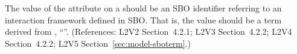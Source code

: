 The value of the  attribute on a \Model should be
an SBO identifier referring to an interaction framework defined
in SBO.  That is, the value should be a term derived from
\sbointeractionID, ``''.  (References: L2V2
Section~4.2.1; L2V3 Section~4.2.2; L2V4 Section~4.2.2; L2V5 Section~\ref{sec:model-sboterm}.)
